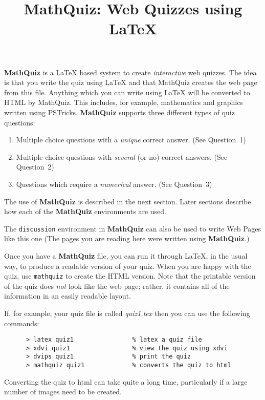 \documentclass{mathquiz}
\title{MathQuiz: Web Quizzes using LaTeX}
\newcommand{\MathQuiz}{\textbf{MathQuiz}}
\begin{document}
\begin{discussion}[Introduction]
  \MathQuiz{} is a \LaTeX{} based system to create \textit{interactive}
  web quizzes.  The idea is that you write the quiz using \LaTeX{} and that
  MathQuiz creates the web page from this file. Anything which you can
  write using \LaTeX{} will be converted to HTML by MathQuiz. This
  includes, for example, mathematics and graphics written using
  PSTricks.  \MathQuiz{} supports three different types of quiz
  questions:

  \begin{enumerate}
  \item Multiple choice questions with a \emph{unique} correct answer.
 (See Question~1)
  \item Multiple choice questions with \emph{several} (or no)
    correct answers.
 (See Question~2)
  \item Questions which require a \emph{numerical} answer.
 (See Question~3)
  \end{enumerate}
The use of \MathQuiz{} is described in the next section. Later
sections describe how each of the \MathQuiz{} environments are used.

The \verb|discussion| environment in \MathQuiz{} can also be used to
write Web Pages like this one (The pages you are reading here were
written using \MathQuiz.)
\end{discussion}
\begin{discussion}
Once you have a \MathQuiz{} file, you can run it through \LaTeX, in
the usual way, to produce a readable version of your quiz. When you
are happy with the quiz, use \verb|mathquiz| to create the HTML
version. Note that the printable version of the quiz does \emph{not}
look like the web page; rather, it contains all of the information in
an easily readable layout.

  If, for example, your quiz file is called \emph{quiz1.tex} then you
  can use the following commands:
\begin{verbatim}
      > latex quiz1                % latex a quiz file
      > xdvi quiz1                 % view the quiz using xdvi
      > dvips quiz1                % print the quiz
      > mathquiz quiz1             % converts the quiz to html
\end{verbatim}
  Converting the quiz to html can take quite a long time, particularly
  if a large number of images need to be created.

\end{discussion}
\end{document}
